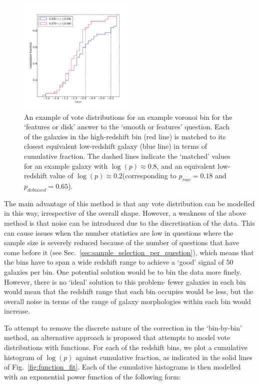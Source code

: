 \documentclass[useAMS,usenatbib]{mn2e}
\begin{document}
\begin{figure}
		\centering

        \includegraphics[width=0.5\textwidth]{Images/Bias/Debiasing/histogram_matching.pdf}

        \caption{An example of vote distributions for an example voronoi bin for the `features or disk' answer to the `smooth or features' question. Each of the galaxies in the high-redshift bin (red line) is matched to its closest equivalent low-redshift galaxy (blue line) in terms of cumulative fraction. The dashed lines indicate the `matched' values for an example galaxy with $\log(p) \approx 0.8$, and an equivalent low-redshift value of $\log(p) \approx 0.2$(corresponding to $p_{raw}=0.18$ and $p_{debiased}=0.65$).}

        \label{fig:histogram_matching}

\end{figure}

The main advantage of this method is that any vote distribution can be modelled in this way, irrespective of the overall shape. However, a weakness of the above method is that noise can be introduced due to the discretisation of the data. This can cause issues when the number statistics are low in questions where the sample size is severely reduced because of the number of questions that have come before it (see Sec.~\ref{sec:sample_selection_per_question}), which means that the bins have to span a wide redshift range to achieve a `good' signal of 50 galaxies per bin. One potential solution would be to bin the data more finely. However, there is no `ideal' solution to this problem- fewer galaxies in each bin would mean that the redshift range that each bin occupies would be less, but the overall noise in terms of the range of galaxy morphologies within each bin would increase. 

To attempt to remove the discrete nature of the correction in the `bin-by-bin' method, an alternative approach is proposed that attempts to model vote distributions with functions. For each of the redshift bins, we plot a cumulative histogram of $\log(p)$ against cumulative fraction, as indicated in the solid lines of Fig.~\ref{fig:function_fit}. Each of the cumulative histograms is then modelled with an exponential power function of the following form:
\end{document}

